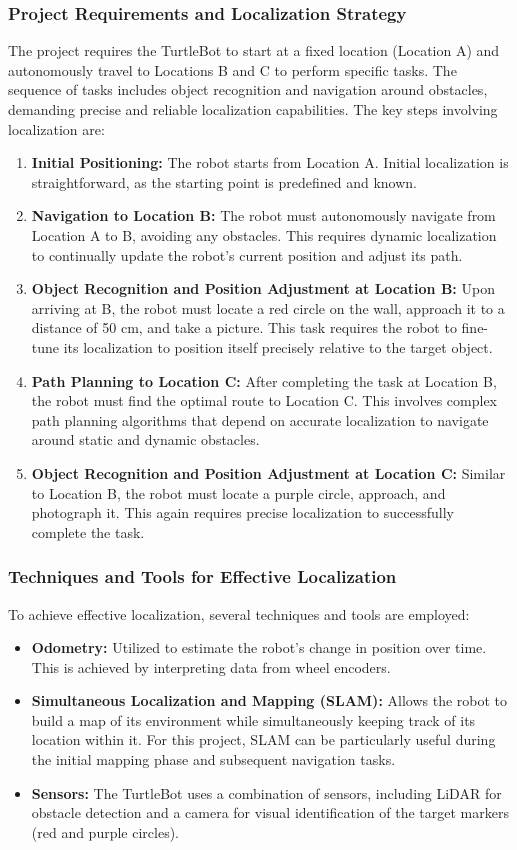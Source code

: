 \documentclass{article}
\begin{document}
	\subsubsection{Project Requirements and Localization Strategy}
	The project requires the TurtleBot to start at a fixed location (Location A) and autonomously travel to Locations B and C to perform specific tasks. The sequence of tasks includes object recognition and navigation around obstacles, demanding precise and reliable localization capabilities. The key steps involving localization are:
	
	\begin{enumerate}
		\item \textbf{Initial Positioning:} The robot starts from Location A. Initial localization is straightforward, as the starting point is predefined and known.
		\item \textbf{Navigation to Location B:} The robot must autonomously navigate from Location A to B, avoiding any obstacles. This requires dynamic localization to continually update the robot's current position and adjust its path.
		\item \textbf{Object Recognition and Position Adjustment at Location B:} Upon arriving at B, the robot must locate a red circle on the wall, approach it to a distance of 50 cm, and take a picture. This task requires the robot to fine-tune its localization to position itself precisely relative to the target object.
		\item \textbf{Path Planning to Location C:} After completing the task at Location B, the robot must find the optimal route to Location C. This involves complex path planning algorithms that depend on accurate localization to navigate around static and dynamic obstacles.
		\item \textbf{Object Recognition and Position Adjustment at Location C:} Similar to Location B, the robot must locate a purple circle, approach, and photograph it. This again requires precise localization to successfully complete the task.
	\end{enumerate}
	
	\subsubsection{Techniques and Tools for Effective Localization}
	To achieve effective localization, several techniques and tools are employed:
	\begin{itemize}
		\item \textbf{Odometry:} Utilized to estimate the robot's change in position over time. This is achieved by interpreting data from wheel encoders.
		\item \textbf{Simultaneous Localization and Mapping (SLAM):} Allows the robot to build a map of its environment while simultaneously keeping track of its location within it. For this project, SLAM can be particularly useful during the initial mapping phase and subsequent navigation tasks.
		\item \textbf{Sensors:} The TurtleBot uses a combination of sensors, including LiDAR for obstacle detection and a camera for visual identification of the target markers (red and purple circles).
	\end{itemize}
	
\end{document}
